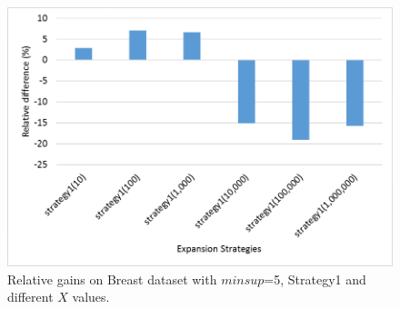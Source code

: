 %
%
%
%
%
\begin{figure}[!t]
\includegraphics[width=5in]{immagini_extension/breast_strategy1.png}
\caption{Relative gains on Breast dataset with $minsup$=5, Strategy1 and different $X$ values.
}
\label{breast_strategy1}
\end{figure}

